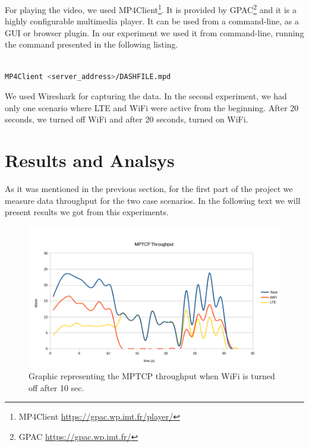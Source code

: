 \documentclass{llncs}
\begin{document}
For playing the video, we used MP4Client\footnote{MP4Client \url{https://gpac.wp.imt.fr/player/}}. It is provided by GPAC\footnote{GPAC \url{https://gpac.wp.imt.fr/}} and it is a highly configurable multimedia player. It can be used from a command-line, as a GUI or browser plugin. In our experiment we used it from command-line, running the command presented in the following listing.

\begin{lstlisting}[language=bash, caption={\label{l:cmd}Command for running MP4Client player.}, captionpos=b]

MP4Client <server_address>/DASHFILE.mpd

\end{lstlisting} 

We used Wireshark for capturing the data. In the second experiment, we had only one scenario where LTE and WiFi were active from the beginning. After 20 seconds, we turned off WiFi and after 20 seconds, turned on WiFi. 

\section{Results and Analsys}
As it was mentioned in the previous section, for the first part of the project we measure data throughput for the two case scenarios. In the following text we will present results we got from this experiments.

\begin{figure}
\centering
\includegraphics[width=1.0\textwidth]{result1.png}
\caption{\label{fig:r1} Graphic representing the MPTCP throughput when WiFi is turned off after 10 sec.}
\end{figure}
\end{document}
